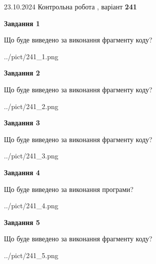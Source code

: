\documentclass[12pt, ukrainian]{article}
\begin{document}
{\Large{23.10.2024 Контрольна робота , варіант  \No \textbf { 241 }\par}}
{
\begin {large}
{\begin {center}\textbf{Завдання 1}\end {center}}

Що буде виведено за виконання фрагменту коду?\par
\begin{center}
	{../pict/241_1.png}
\end{center}
\newpage

{\begin {center}\textbf{Завдання 2}\end {center}}

Що буде виведено за виконання фрагменту коду?\par
\begin{center}
	{../pict/241_2.png}
\end{center}
\newpage

{\begin {center}\textbf{Завдання 3}\end {center}}

Що буде виведено за виконання фрагменту коду?\par
\begin{center}
	{../pict/241_3.png}
\end{center}
\newpage

{\begin {center}\textbf{Завдання 4}\end {center}}

Що буде виведено за виконання програми?\par
\begin{center}
	{../pict/241_4.png}
\end{center}
\newpage

{\begin {center}\textbf{Завдання 5}\end {center}}

Що буде виведено за виконання фрагменту коду?\par
\begin{center}
	{../pict/241_5.png}
\end{center}
\newpage


\end{large}}
\end{document}
